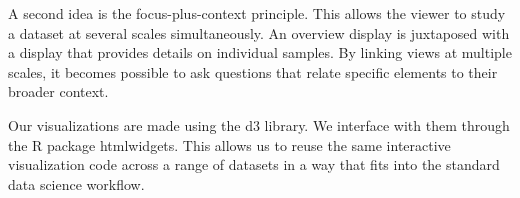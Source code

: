 A second idea is the focus-plus-context principle. This allows the viewer to study a dataset at several scales simultaneously. An overview display is juxtaposed with a display that provides details on individual samples. By linking views at multiple scales, it becomes possible to ask questions that relate specific elements to their broader context.

Our visualizations are made using the d3 library. We interface with them through the R package htmlwidgets. This allows us to reuse the same interactive visualization code across a range of datasets in a way that fits into the standard data science workflow.
